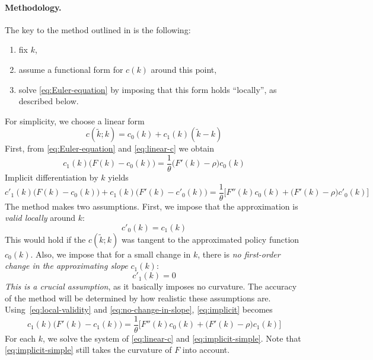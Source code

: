 \documentclass[a4paper,11pt]{article}
\newcommand{\tk}{\tilde{k}}
\begin{document}
\paragraph{Methodology.} The key to the method outlined in \textcite{den2015exact} is the following:
\begin{enumerate}
\item fix $k$,
\item assume a functional form for $c(k)$ around this point,
\item solve \eqref{eq:Euler-equation} by imposing that this form holds ``locally'', as described below.
\end{enumerate}
For simplicity, we choose a linear form
\begin{equation}
  \label{eq:linear-c}
  c(\tk; k) = c_0(k) + c_1(k)(\tk-k)
\end{equation}
First, from \eqref{eq:Euler-equation} and \eqref{eq:linear-c} we obtain
\begin{equation}
  \label{eq:linear-Euler}
  c_1(k)\bigl( F(k) - c_0(k) \bigr) = \frac{1}{\theta}\bigl( F'(k) - \rho \bigr) c_0(k)
\end{equation}
Implicit differentiation by $k$ yields
\begin{equation}
  \label{eq:implicit}
  c'_1(k)\bigl( F(k) - c_0(k) \bigr) + c_1(k)\bigl( F'(k) - c'_0(k) \bigr) =
  \frac{1}{\theta}\biggl[ F''(k) c_0(k) + \bigl( F'(k) - \rho \bigr) c'_0(k) \biggr]
\end{equation}
The method makes two assumptions. First, we impose that the approximation is \emph{valid locally} around $k$:
\begin{equation}
  \label{eq:local-validity}
  c'_0(k) = c_1(k)
\end{equation}
This would hold if the $c(\tk;k)$ was tangent to the approximated policy function $c_0(k)$. Also, we impose that for a small change in $k$, there is \emph{no first-order change in the approximating slope} $c_1(k)$:
\begin{equation}
  \label{eq:no-change-in-slope}
  c'_1(k) = 0
\end{equation}
\emph{This is a crucial assumption}, as it basically imposes no curvature. The accuracy of the method will be determined by how realistic these assumptions are. Using~\eqref{eq:local-validity} and \eqref{eq:no-change-in-slope}, \eqref{eq:implicit} becomes
\begin{equation}
  \label{eq:implicit-simple}
  c_1(k)\bigl( F'(k) - c_1(k) \bigr) = \frac{1}{\theta}\biggl[ F''(k) c_0(k) + \bigl( F'(k) - \rho \bigr) c_1(k) \biggr]
\end{equation}
For each $k$, we solve the system of \eqref{eq:linear-c} and \eqref{eq:implicit-simple}.
Note that \eqref{eq:implicit-simple} still takes the curvature of $F$ into account.
\end{document}
